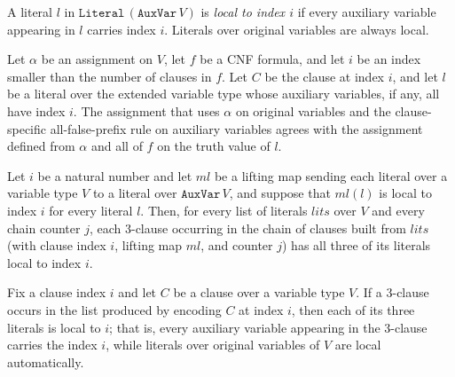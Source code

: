 \begin{definition}
\label{SATTo3SAT.IsLocalVar}
\leanok
{}
A literal $l$ in $\mathtt{Literal}\,(\mathtt{AuxVar}\,V)$ is \emph{local to index $i$} if
every auxiliary variable appearing in $l$ carries index $i$.  Literals over original
variables are always local.
\end{definition}

\begin{lemma}
\label{SATTo3SAT.eval_local_eq_global}
\leanok
{}
Let $\alpha$ be an assignment on $V$, let $f$ be a CNF formula, and let $i$ be an index
smaller than the number of clauses in $f$. Let $C$ be the clause at index $i$, and let
$l$ be a literal over the extended variable type whose auxiliary variables, if any, all
have index $i$. The assignment that uses $\alpha$ on original variables and the
clause-specific all-false-prefix rule on auxiliary variables agrees with the assignment
defined from $\alpha$ and all of $f$ on the truth value of $l$.
\end{lemma}

\begin{lemma}
\label{SATTo3SAT.buildChain_isLocal}
\leanok
{}
Let $i$ be a natural number and let $ml$ be a lifting map sending each literal over a
variable type $V$ to a literal over $\mathtt{AuxVar}\,V$, and suppose that $ml(l)$ is
local to index $i$ for every literal $l$. Then, for every list of literals
$\mathit{lits}$ over $V$ and every chain counter $j$, each $3$-clause occurring in the
chain of clauses built from $\mathit{lits}$ (with clause index $i$, lifting map $ml$,
and counter $j$) has all three of its literals local to index $i$.
\end{lemma}

\begin{lemma}
\label{SATTo3SAT.transformClause_isLocal}
\leanok
{}
Fix a clause index $i$ and let $C$ be a clause over a variable type $V$. If a 3-clause
occurs in the list produced by encoding $C$ at index $i$, then each of its three
literals is local to $i$; that is, every auxiliary variable appearing in the 3-clause
carries the index $i$, while literals over original variables of $V$ are local
automatically.
\end{lemma}


